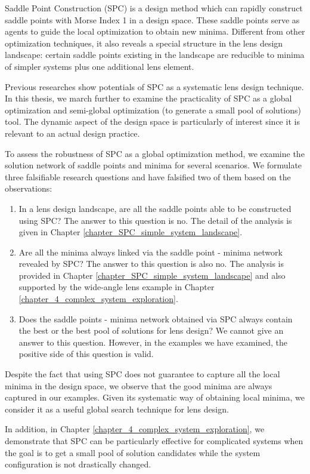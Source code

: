 Saddle Point Construction (SPC) is a design method which can rapidly construct saddle points with Morse Index 1 in a design space. These saddle points serve as agents to guide the local optimization to obtain new minima. Different from other optimization techniques, it also reveals a special structure in the lens design landscape: certain saddle points existing in the landscape are reducible to minima of simpler systems plus one additional lens element.

Previous researches show potentials of SPC as a systematic lens design technique. In this thesis, we march further to examine the practicality of SPC as a global optimization and semi-global optimization (to generate a small pool of solutions) tool. The dynamic aspect of the design space is particularly of interest since it is relevant to an actual design practice. 

To assess the robustness of SPC as a global optimization method, we examine the solution network of saddle points and minima for several scenarios. We formulate three falsifiable research questions and have falsified two of them based on the observations:
\begin{enumerate}[nosep]
\item In a lens design landscape, are all the saddle points able to be constructed using SPC? The answer to this question is no. The detail of the analysis is given in Chapter \ref{chapter_SPC_simple_system_landscape}.
\item Are all the minima always linked via the saddle point - minima network revealed by SPC? The answer to this question is also no. The analysis is provided in Chapter \ref{chapter_SPC_simple_system_landscape} and also supported by the wide-angle lens example in Chapter \ref{chapter_4_complex_system_exploration}.
\item Does the saddle points - minima network obtained via SPC always contain the best or the best pool of solutions for lens design? We cannot give an answer to this question. However, in the examples we have examined, the positive side of this question is valid. 
\end{enumerate}

Despite the fact that using SPC does not guarantee to capture all the local minima in the design space, we observe that the good minima are always captured in our examples. Given its systematic way of obtaining local minima, we consider it as a useful global search technique for lens design. 

In addition, in Chapter \ref{chapter_4_complex_system_exploration}, we demonstrate that SPC can be particularly effective for complicated systems when the goal is to get a small pool of solution candidates while the system configuration is not drastically changed. 

